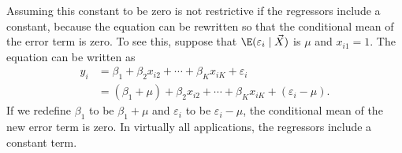 Assuming this constant to be zero is not restrictive if the regressors include a constant,
because the equation can be rewritten so that the conditional mean of the error term is
zero.  To see this, suppose that $\E(\varepsilon_i \mid \vec{X})$ is $\mu$ and
$x_{i1} = 1$.  The equation can be written as
\begin{align*}
  y_i &= \beta_1 + \beta_2 x_{i2} + \cdots + \beta_K x_{iK} + \varepsilon_i \\
      &= (\beta_1 + \mu) + \beta_2 x_{i2} + \cdots + \beta_K x_{iK}
         + (\varepsilon_i - \mu).
\end{align*}
If we redefine $\beta_1$ to be $\beta_1 + \mu$ and $\varepsilon_i$ to be
$\varepsilon_i - \mu$, the conditional mean of the new error term is zero.  In virtually
all applications, the regressors include a constant term.

